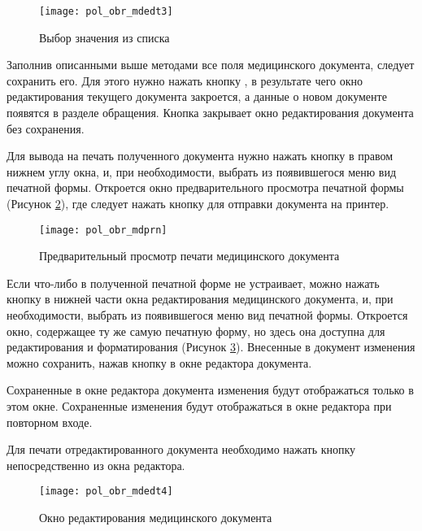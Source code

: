  \begin{figure}[ht!]\centering
   \texttt{[image: pol\_obr\_mdedt3]}
   \caption{Выбор значения из списка}
   \label{img_pol_obr_mdedt3}
 \end{figure}
  
Заполнив описанными выше методами все поля медицинского документа, следует сохранить его. Для этого нужно нажать кнопку , в результате чего окно редактирования текущего документа закроется, а данные о новом документе появятся в разделе  обращения. Кнопка  закрывает окно редактирования документа без сохранения.

Для вывода на печать полученного документа нужно нажать кнопку  в правом нижнем углу окна, и, при необходимости, выбрать из появившегося меню вид печатной формы. Откроется окно предварительного просмотра печатной формы (Рисунок \ref{img_pol_obr_mdprn}), где следует нажать кнопку  для отправки документа на принтер.

 \begin{figure}[ht]\centering
   \texttt{[image: pol\_obr\_mdprn]}
   \caption{Предварительный просмотр печати медицинского документа}
   \label{img_pol_obr_mdprn}
 \end{figure}
 
Если что-либо в полученной печатной форме не устраивает, можно нажать кнопку   в нижней части окна редактирования медицинского документа, и, при необходимости, выбрать из появившегося меню вид печатной формы. Откроется окно, содержащее ту же самую печатную форму, но здесь она доступна для редактирования и форматирования (Рисунок \ref{img_pol_obr_mdedt4}). Внесенные в документ изменения можно сохранить, нажав кнопку  в окне редактора документа.

\begin{vnim}
 Сохраненные в окне редактора документа  изменения будут отображаться только в этом окне. Сохраненные изменения будут отображаться в окне редактора при повторном входе.
\end{vnim}
 
Для печати отредактированного документа необходимо нажать кнопку  непосредственно из окна редактора.

 \begin{figure}[ht]\centering
   \texttt{[image: pol\_obr\_mdedt4]}
   \caption{Окно редактирования медицинского документа}
   \label{img_pol_obr_mdedt4}
 \end{figure}

